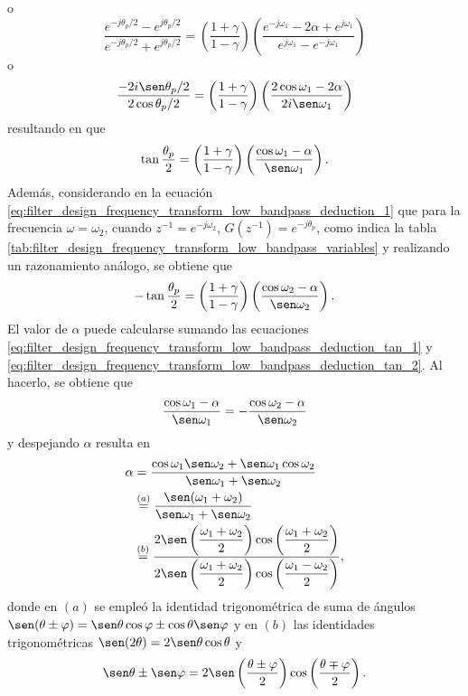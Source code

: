 \documentclass[a4paper]{report}
\begin{document}
o
\[
 \frac{e^{-j\theta_p/2}-e^{j\theta_p/2}}{e^{-j\theta_p/2}+e^{j\theta_p/2}}=\left(\frac{1+\gamma}{1-\gamma}\right)\left(\frac{e^{-j\omega_1}-2\alpha+e^{j\omega_1}}{e^{j\omega_1}-e^{-j\omega_1}}\right)
\]
o
\[
 \frac{-2i\sen\theta_p/2}{2\cos\theta_p/2}=\left(\frac{1+\gamma}{1-\gamma}\right)\left(\frac{2\cos\omega_1-2\alpha}{2i\sen\omega_1}\right)
\]
resultando en que 
\begin{equation}\label{eq:filter_design_frequency_transform_low_bandpass_deduction_tan_1}
 \tan\frac{\theta_p}{2}=\left(\frac{1+\gamma}{1-\gamma}\right)\left(\frac{\cos\omega_1-\alpha}{\sen\omega_1}\right). 
\end{equation}
Además, considerando en la ecuación \ref{eq:filter_design_frequency_transform_low_bandpass_deduction_1} que para la frecuencia \(\omega=\omega_2\), cuando \(z^{-1}=e^{-j\omega_2}\), \(G(z^{-1})=e^{-j\theta_p}\), como indica la tabla \ref{tab:filter_design_frequency_transform_low_bandpass_variables} y realizando un razonamiento análogo, se obtiene que
\begin{equation}\label{eq:filter_design_frequency_transform_low_bandpass_deduction_tan_2}
 -\tan\frac{\theta_p}{2}=\left(\frac{1+\gamma}{1-\gamma}\right)\left(\frac{\cos\omega_2-\alpha}{\sen\omega_2}\right). 
\end{equation}
El valor de \(\alpha\) puede calcularse sumando las ecuaciones \ref{eq:filter_design_frequency_transform_low_bandpass_deduction_tan_1} y \ref{eq:filter_design_frequency_transform_low_bandpass_deduction_tan_2}. Al hacerlo, se obtiene que 
\[
 \frac{\cos\omega_1-\alpha}{\sen\omega_1}=-\frac{\cos\omega_2-\alpha}{\sen\omega_2}
\]
y despejando \(\alpha\) resulta en
\begin{align}
 \alpha&=\frac{\cos\omega_1\sen\omega_2+\sen\omega_1\cos\omega_2}{\sen\omega_1+\sen\omega_2}\label{eq:filter_design_frequency_transform_low_bandpass_deduction_2}\\
  &\overset{(a)}{=}\frac{\sen(\omega_1+\omega_2)}{\sen\omega_1+\sen\omega_2}\nonumber\\
  &\overset{(b)}{=}\dfrac{2\sen\left(\dfrac{\omega_1+\omega_2}{2}\right)\cos\left(\dfrac{\omega_1+\omega_2}{2}\right)}{2\sen\left(\dfrac{\omega_1+\omega_2}{2}\right)\cos\left(\dfrac{\omega_1-\omega_2}{2}\right)},\nonumber
\end{align}
donde en \((a)\) se empleó la identidad trigonométrica de suma de ángulos \(\sen(\theta\pm\varphi)=\sen\theta\cos\varphi\pm\cos\theta\sen\varphi\) y en \((b)\) las identidades trigonométricas \(\sen(2\theta)=2\sen\theta\cos\theta\) y 
\begin{equation}\label{eq:trigonometric_sine_sum}
 \sen\theta\pm\sen\varphi=2\sen\left(\frac{\theta \pm \varphi}{2}\right)\cos\left(\frac{\theta\mp\varphi}{2}\right). 
\end{equation}
\end{document}
